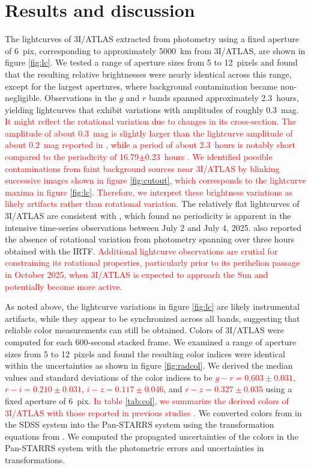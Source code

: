 \documentclass[]{pasj02}
\newcommand{\RED}[1]{\textcolor{red}{#1}}
\newcommand\I{3I/ATLAS\xspace}
\newcommand\gr{\RED{$g-r=0.603\pm0.031$}\xspace}
\newcommand\ri{\RED{$r-i=0.210\pm0.031$}\xspace}
\newcommand\iz{\RED{$i-z=0.117\pm0.046$}\xspace}
\newcommand\rz{\RED{$r-z=0.327\pm0.035$}\xspace}
\begin{document}
\section{Results and discussion}\label{sec:res}
The lightcurves of \I extracted from photometry using a fixed aperture of 6~pix, corresponding to approximately 5000~km from \I, are shown in figure \ref{fig:lc}.
We tested a range of aperture sizes from 5 to 12~pixels and found that the resulting relative brightnesses were nearly identical across this range, except for the largest apertures, where background contamination became non-negligible.
Observations in the $g$ and $r$ bands spanned approximately 2.3~hours, yielding lightcurves that exhibit variations with amplitudes of roughly 0.3~mag.
\RED{
    It might reflect the rotational variation due to changes in its cross-section. 
    The amplitude of about 0.3~mag is slightly larger than the lightcurve amplitude of about 0.2~mag reported in \citet{Marcos2025_3I},
    while a period of about 2.3~hours is notably short compared to the periodicity of 16.79$\pm$0.23~hours \citep{Marcos2025_3I}. 
    We identified possible contaminations from faint background sources near \I
    by blinking successive images shown in figure \ref{fig:cutout},
    which corresponds to the lightcurve maxima in figure \ref{fig:lc}.
    Therefore, we interpret these brightness variations as likely artifacts rather than rotational variation. 
    }
The relatively flat lightcurves of \I are consistent with \citet{Seligman2025_3I}, 
which found no periodicity is apparent in the intensive time-series observations between July 2 and July 4, 2025. 
\citet{Kareta2025_3I} also reported the absence of rotational variation from photometry spanning over three hours obtained with the IRTF.
\RED{
    Additional lightcurve observations are crutial for constraining its rotational properties, 
    particularly prior to its perihelion passage in October 2025, when \I is expected to approach the Sun and potentially become more active.   
    }

As noted above, the lightcurve variations in figure \ref{fig:lc} are likely
instrumental artifacts, while they appear to be synchronized across all bands, suggesting that reliable color measurements can still be obtained.
Colors of \I were computed for each 600-second stacked frame.
We examined a range of aperture sizes from 5 to 12~pixels and found the resulting color indices were identical within the uncertainties as shown in figure \ref{fig:radcol}.
We derived the median values and standard deviations of the color indices to be \gr, \ri, \iz, and \rz using a fixed aperture of 6~pix.
\RED{
    In table \ref{tab:col}, we summarize the derived colors of \I with those reported in previous studies \citep{Bolin2025_3I, Seligman2025_3I}.
    }
We converted colors from \citet{Bolin2025_3I} in the SDSS system into the Pan-STARRS system using the transformation equations from \cite{Tonry2012}.
We computed the propagated uncertainties of the colors in the Pan-STARRS system with the photometric errors and uncertainties in transformations.
\end{document}

